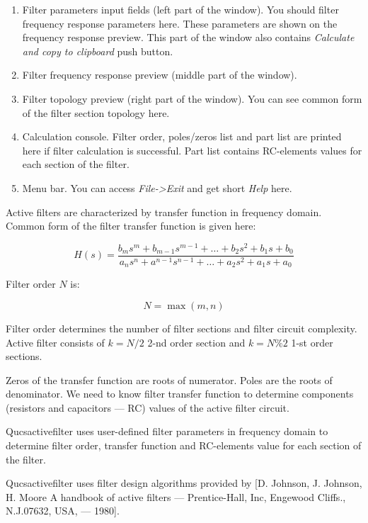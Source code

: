 \begin{enumerate}
 \item Filter parameters input fields (left part of the window). You should
filter frequency response parameters here. These
parameters are shown on the frequency response preview. This part of the window
also contains \emph{Calculate and copy to clipboard} push button.
 \item Filter frequency response preview (middle part of the window). 
 \item Filter topology preview (right part of the window). You can see
common form of the filter section topology here.
 \item Calculation console. Filter order, poles/zeros list and part list are
printed here if filter calculation is successful. Part list contains
RC-elements values for each section of the filter.
 \item Menu bar. You can access \emph{File->Exit} and get short \emph{Help}
here.
\end{enumerate}

 


Active filters are characterized by transfer function in frequency domain.
Common form of the filter transfer function is given here:

\begin{equation}
 H(s)=\frac{b_m s^m+b_{m-1}s^{m-1}+\ldots+b_2 s^2+b_1 s+b_0}
           {a_n s^n+a^{n-1}s^{n-1}+\ldots+a_2 s^2+a_1 s+a_0}
\end{equation}

Filter order $N$ is:

\begin{equation}
 N = \max(m,n)
\end{equation}

Filter order determines the number of filter sections and filter circuit
complexity. Active filter consists of $k=N/2$ 2-nd order section and $k=N\%2$
1-st order sections. 

Zeros of the transfer function are roots of numerator.  Poles are the roots of
denominator. We need to know filter transfer function to determine components
(resistors and capacitors --- RC) values of the active filter circuit.

Qucsactivefilter uses user-defined filter parameters in frequency domain to
determine filter order, transfer function and RC-elements value for each
section of the filter.

Qucsactivefilter uses filter design algorithms provided by [D. Johnson, J.
Johnson, H. Moore A handbook of active filters --- Prentice-Hall, Inc,
Engewood Cliffs., N.J.07632, USA, --- 1980].


